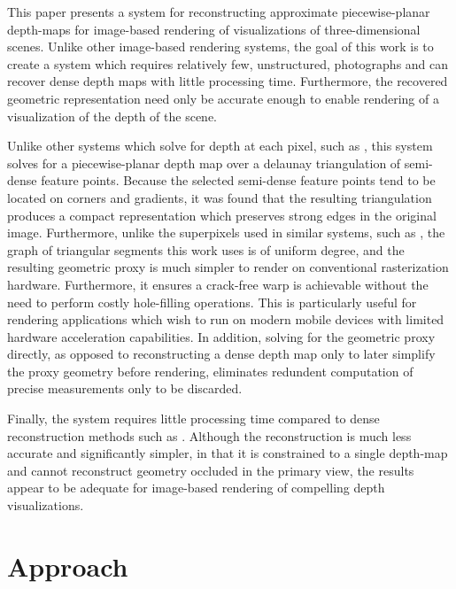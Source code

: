 \documentclass[conference]{acmsiggraph}
\begin{document}
This paper presents a system for reconstructing approximate
piecewise-planar depth-maps for image-based rendering of visualizations
of three-dimensional scenes.  Unlike other image-based rendering systems,
the goal of this work is to create a system which requires relatively few,
unstructured, photographs and can recover dense depth maps with little
processing time.  Furthermore, the recovered geometric representation need
only be accurate enough to enable rendering of a visualization of the depth
of the scene.

Unlike other systems which solve for depth at each pixel,
such as \cite{stuhmer2010real}, this system solves
for a piecewise-planar depth map over a delaunay triangulation
of semi-dense feature points.  Because the selected
semi-dense feature points tend to be located on corners
and gradients, it was found that the resulting triangulation
produces a compact representation which preserves strong
edges in the original image.  Furthermore, unlike the superpixels
used in similar systems, such as \cite{chaurasia2013depth},
the graph of triangular segments this work uses is of uniform degree,
and the resulting geometric proxy is much simpler to render on conventional
rasterization hardware. Furthermore, it ensures a crack-free warp is
achievable without the need to perform costly hole-filling operations.
This is particularly useful for rendering applications which wish to
run on modern mobile devices with limited hardware acceleration capabilities.
In addition, solving for the geometric proxy directly, as opposed to 
reconstructing a dense depth map only to later simplify the proxy geometry
before rendering, eliminates redundent computation of precise measurements
only to be discarded.

Finally, the system requires little processing time compared
to dense reconstruction methods such as \cite{furukawa2010accurate}.
Although the reconstruction is much less accurate and significantly simpler,
in that it is constrained to a single depth-map and cannot reconstruct
geometry occluded in the primary view,
the results appear to be adequate for image-based rendering of compelling depth
visualizations.

\section{Approach}
\end{document}
